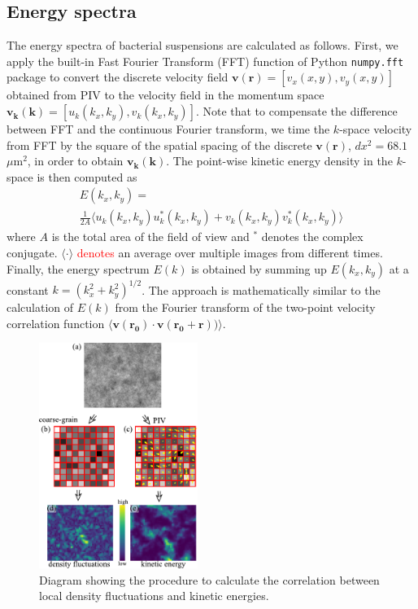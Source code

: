 \documentclass[twocolumn,aps,prx,amsmath,amssymb,longbibliography,superscriptaddress]{revtex4-2}
\begin{document}
\subsection{Energy spectra} \label{appendix-IA-ES}
The energy spectra of bacterial suspensions are calculated as follows. First, we apply the built-in Fast Fourier Transform (FFT) function of Python \texttt{numpy.fft} package to convert the discrete velocity field $\bm{v}(\bm{r}) = [v_x(x,y), v_y(x,y)]$ obtained from PIV to the velocity field in the momentum space $\bm{v_k}(\bm{k}) = [u_k(k_x,k_y),v_k(k_x,k_y)]$. Note that to compensate the difference between FFT and the continuous Fourier transform, we time the $k$-space velocity from FFT by the square of the spatial spacing of the discrete $\bm{v}(\bm{r})$, $dx^2 = 68.1$ $\mu$m$^2$, in order to obtain $\bm{v_k}(\bm{k})$. The point-wise kinetic energy density in the $k$-space is then computed as
\begin{multline}
	E(k_x, k_y) = \\
	\frac{1}{2A}\langle u_k(k_x, k_y)u^*_k(k_x, k_y)+v_k(k_x, k_y)v_k^*(k_x, k_y)\rangle
\end{multline}
where $A$ is the total area of the field of view and $^*$ denotes the complex conjugate. $\langle\cdot\rangle$ \textcolor{red}{denotes} an average over multiple images from different times. Finally, the energy spectrum $E(k)$ is obtained by summing up $E(k_x,k_y)$ at a constant $k=(k_x^2+k_y^2)^{1/2}$. The approach is mathematically similar to the calculation of $E(k)$ from the Fourier transform of the two-point velocity correlation function $\langle \bm{v}(\bm{r_0}) \cdot \bm{v}(\bm{r_0}+\bm{r})) \rangle$.


\begin{figure}[t]
	\begin{center}
		\includegraphics[width=0.46\textwidth]{Figures/fig-9.pdf}
		\caption[Density autocorrelation]
		{
			Diagram showing the procedure to calculate the correlation between local density fluctuations and kinetic energies.
		}
		\label{fig:coupling-calculation}
	\end{center}
\end{figure}
\end{document}
